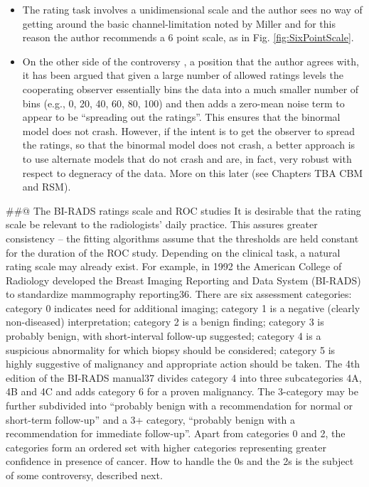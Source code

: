 \documentclass[
]{book}
\begin{document}
\begin{itemize}
\item
  The rating task involves a unidimensional scale and the author sees no way of getting around the basic channel-limitation noted by Miller and for this reason the author recommends a 6 point scale, as in Fig. \ref{fig:SixPointScale}.
\item
  On the other side of the controversy \citep{RN2145}, a position that the author agrees with, it has been argued that given a large number of allowed ratings levels the cooperating observer essentially bins the data into a much smaller number of bins (e.g., 0, 20, 40, 60, 80, 100) and then adds a zero-mean noise term to appear to be ``spreading out the ratings''. This ensures that the binormal model does not crash. However, if the intent is to get the observer to spread the ratings, so that the binormal model does not crash, a better approach is to use alternate models that do not crash and are, in fact, very robust with respect to degneracy of the data. More on this later (see Chapters TBA CBM and RSM).
\end{itemize}

\#\#@ The BI-RADS ratings scale and ROC studies
It is desirable that the rating scale be relevant to the radiologists' daily practice. This assures greater consistency -- the fitting algorithms assume that the thresholds are held constant for the duration of the ROC study. Depending on the clinical task, a natural rating scale may already exist. For example, in 1992 the American College of Radiology developed the Breast Imaging Reporting and Data System (BI-RADS) to standardize mammography reporting36. There are six assessment categories: category 0 indicates need for additional imaging; category 1 is a negative (clearly non-diseased) interpretation; category 2 is a benign finding; category 3 is probably benign, with short-interval follow-up suggested; category 4 is a suspicious abnormality for which biopsy should be considered; category 5 is highly suggestive of malignancy and appropriate action should be taken. The 4th edition of the BI-RADS manual37 divides category 4 into three subcategories 4A, 4B and 4C and adds category 6 for a proven malignancy. The 3-category may be further subdivided into ``probably benign with a recommendation for normal or short-term follow-up'' and a 3+ category, ``probably benign with a recommendation for immediate follow-up''. Apart from categories 0 and 2, the categories form an ordered set with higher categories representing greater confidence in presence of cancer. How to handle the 0s and the 2s is the subject of some controversy, described next.
\end{document}
